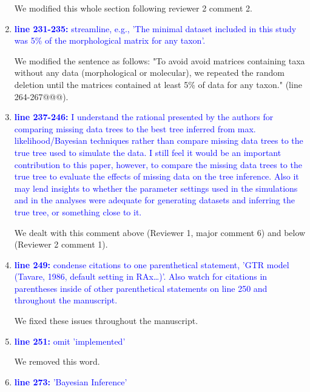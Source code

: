 \documentclass[12pt,letterpaper]{article}
\begin{document}
\begin{enumerate}
We modified this whole section following reviewer 2 comment 2.

\item{\textcolor{blue}{\textbf{line 231-235:} streamline, e.g., 'The minimal dataset included in this study was 5\% of the morphological matrix for any taxon'.}}

We modified the sentence as follows: "To avoid avoid matrices containing taxa without any data (morphological or molecular), we repeated the random deletion until the matrices contained at least 5\% of data for any taxon." (line 264-267@@@).

\item{\textcolor{blue}{\textbf{line 237-246:} I understand the rational presented by the authors for comparing missing data trees to the best tree inferred from max. likelihood/Bayesian techniques rather than compare missing data trees to the true tree used to simulate the data. I still feel it would be an important contribution to this paper, however, to compare the missing data trees to the true tree to evaluate the effects of missing data on the tree inference. Also it may lend insights to whether the parameter settings used in the simulations and in the analyses were adequate for generating datasets and inferring the true tree, or something close to it. }}

We dealt with this comment above (Reviewer 1, major comment 6) and below (Reviewer 2 comment 1).

\item{\textcolor{blue}{\textbf{line 249:} condense citations to one parenthetical statement, 'GTR model (Tavare, 1986, default setting in RAx…)'. Also watch for citations in parentheses inside of other parenthetical statements on line 250 and throughout the manuscript. }}

We fixed these issues throughout the manuscript.

\item{\textcolor{blue}{\textbf{line 251:} omit 'implemented'}}

We removed this word.

\item{\textcolor{blue}{\textbf{line 273:} 'Bayesian Inference'}}


\end{enumerate}
\end{document}
